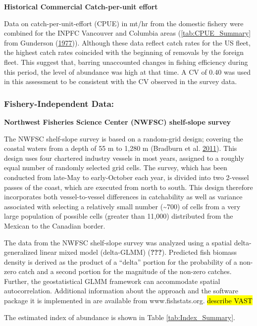 \documentclass[12pt,]{article}
\begin{document}
\textbf{Historical Commercial Catch-per-unit effort}

Data on catch-per-unit-effort (CPUE) in mt/hr from the domestic fishery
were combined for the INPFC Vancouver and Columbia areas
(\ref{tab:CPUE_Summary} from Gunderson
(\protect\hyperlink{ref-gunderson_population_1977}{1977})). Although
these data reflect catch rates for the US fleet, the highest catch rates
coincided with the beginning of removals by the foreign fleet. This
suggest that, barring unaccounted changes in fishing efficiency during
this period, the level of abundance was high at that time. A CV of 0.40
was used in this assessment to be consistent with the CV observed in the
survey data.

\subsubsection{Fishery-Independent
Data:}\label{fishery-independent-data}

\textbf{Northwest Fisheries Science Center (NWFSC) shelf-slope survey}

The NWFSC shelf-slope survey is based on a random-grid design; covering
the coastal waters from a depth of 55 m to 1,280 m (Bradburn et al.
\protect\hyperlink{ref-bradburn_2003_2011}{2011}). This design uses four
chartered industry vessels in most years, assigned to a roughly equal
number of randomly selected grid cells. The survey, which has been
conducted from late-May to early-October each year, is divided into two
2-vessel passes of the coast, which are executed from north to south.
This design therefore incorporates both vessel-to-vessel differences in
catchability as well as variance associated with selecting a relatively
small number (\textasciitilde{}700) of cells from a very large
population of possible cells (greater than 11,000) distributed from the
Mexican to the Canadian border.

The data from the NWFSC shelf-slope survey was analyzed using a spatial
delta-generalized linear mixed model (delta-GLMM) ({\textbf{???}}).
Predicted fish biomass density is derived as the product of a ``delta''
portion for the probability of a non-zero catch and a second portion for
the magnitude of the non-zero catches. Further, the geostatistical GLMM
framework can accommodate spatial autocorrelation. Additional
information about the approach and the software package it is
implemented in are available from www.fishstats.org. \hl{describe VAST}

The estimated index of abundance is shown in Table
\ref{tab:Index_Summary}.
\end{document}
